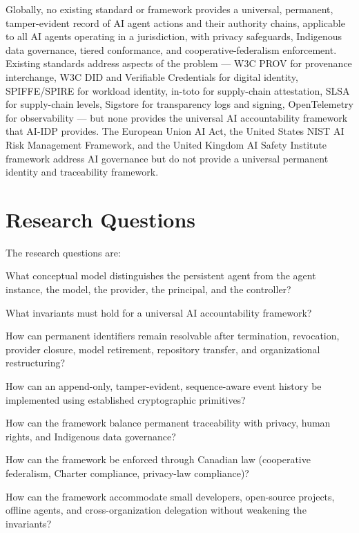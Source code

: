 \documentclass[11pt,a4paper]{article}
\begin{document}
Globally, no existing standard or framework provides a universal, permanent, tamper-evident record of AI agent actions and their authority chains, applicable to all AI agents operating in a jurisdiction, with privacy safeguards, Indigenous data governance, tiered conformance, and cooperative-federalism enforcement. Existing standards address aspects of the problem --- W3C PROV for provenance interchange, W3C DID and Verifiable Credentials for digital identity, SPIFFE/SPIRE for workload identity, in-toto for supply-chain attestation, SLSA for supply-chain levels, Sigstore for transparency logs and signing, OpenTelemetry for observability --- but none provides the universal AI accountability framework that AI-IDP provides. The European Union AI Act, the United States NIST AI Risk Management Framework, and the United Kingdom AI Safety Institute framework address AI governance but do not provide a universal permanent identity and traceability framework.

\section{Research Questions}
\label{sec:questions}

The research questions are:

\begin{description}[style=nextline]
\item[\textbf{RQ1}] What conceptual model distinguishes the persistent agent from the agent instance, the model, the provider, the principal, and the controller?
\item[\textbf{RQ2}] What invariants must hold for a universal AI accountability framework?
\item[\textbf{RQ3}] How can permanent identifiers remain resolvable after termination, revocation, provider closure, model retirement, repository transfer, and organizational restructuring?
\item[\textbf{RQ4}] How can an append-only, tamper-evident, sequence-aware event history be implemented using established cryptographic primitives?
\item[\textbf{RQ5}] How can the framework balance permanent traceability with privacy, human rights, and Indigenous data governance?
\item[\textbf{RQ6}] How can the framework be enforced through Canadian law (cooperative federalism, Charter compliance, privacy-law compliance)?
\item[\textbf{RQ7}] How can the framework accommodate small developers, open-source projects, offline agents, and cross-organization delegation without weakening the invariants?
\end{description}
\end{document}

